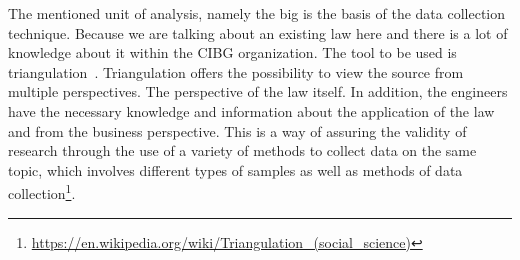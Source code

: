 The mentioned unit of analysis, namely the \acrfull{big} is the basis of the data collection technique.
Because we are talking about an existing law here and there is a lot of knowledge about it within the CIBG organization.
The tool to be used is triangulation~\citep{carter_use_2014, farquhar_triangulation_2020, runeson_guidelines_2008}.
Triangulation offers the possibility to view the source from multiple perspectives.
The perspective of the law itself.
In addition, the engineers have the necessary knowledge and information about the application of the law and from the business perspective.
This is a way of assuring the validity of research through the use of a variety of methods to collect data on the same topic, which involves different types of samples as well as methods of data collection\footnote{\url{https://en.wikipedia.org/wiki/Triangulation_(social_science)}}.



